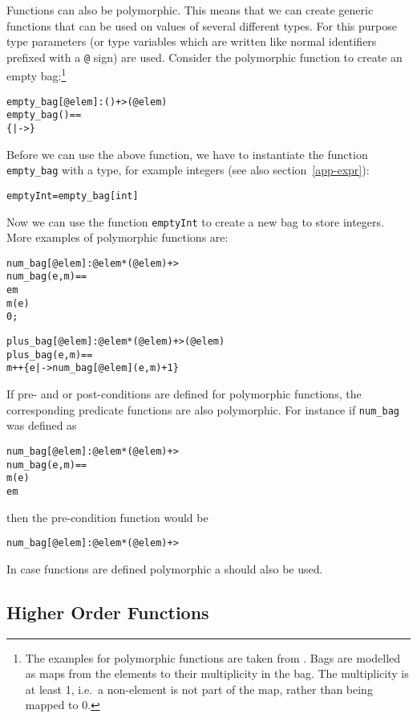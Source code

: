 \documentclass[\pformat,12pt]{article}
\begin{document}
Functions can also be polymorphic. This means that we can create
generic functions that can be used on values of several different
types. For this purpose type parameters (or type variables which are
written like normal identifiers prefixed with a {\tt @} sign) are
used. Consider the polymorphic function to create an empty
bag:\footnote{The examples for polymorphic functions are taken from
\cite{Dawes91}. Bags are modelled as maps from the elements to their
multiplicity in the bag. The multiplicity is at least 1, i.e.\ a
non-element is not part of the map, rather than being mapped to 0.}
\begin{alltt}
  empty_bag[@elem] : () +> ( @elem )
  empty_bag() ==
    \{ |-> \}
\end{alltt}
Before we can use the above function, we have to instantiate the
function {\tt empty\_bag} with a type, for example integers (see also
section~\ref{app-expr}):
\begin{alltt}
  emptyInt = empty_bag[int]
\end{alltt}
Now we can use the function {\tt emptyInt} to create a new bag to store
integers. More examples of polymorphic functions are:
\begin{alltt}
  num_bag[@elem] : @elem * ( @elem ) +> 
  num_bag(e, m) ==
     e  m
     m(e)
     0;

  plus_bag[@elem] : @elem * ( @elem ) +> ( @elem )
  plus_bag(e, m) ==
    m ++ \{ e |-> num_bag[@elem](e, m) + 1 \}
\end{alltt} 
If pre- and or post-conditions are defined for polymorphic functions, the
corresponding predicate functions are also polymorphic. For instance
if \texttt{num\_bag} was defined as
\begin{alltt}
  num_bag[@elem] : @elem * ( @elem ) +> 
  num_bag(e, m) ==
    m(e)
   e  m
\end{alltt}
then the pre-condition function would be
\begin{alltt}
  num_bag[@elem] :@elem * ( @elem ) +> 
\end{alltt}

In case functions are defined polymorphic a  should also be
used.

\subsection{Higher Order Functions}
\end{document}
